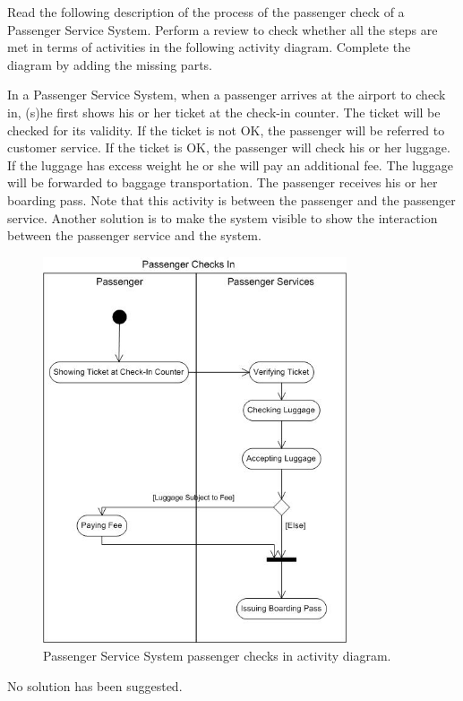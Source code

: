\begin{exercise}
    Read the following description of the process of the passenger check of a Passenger Service System. Perform a review to check whether all the steps are met in terms of activities in the following activity diagram. Complete the diagram by adding the missing parts.
    
    \begin{displayquote}
        In a Passenger Service System, when a passenger arrives at the airport to check in, (s)he first shows his or her ticket at the check-in counter. The ticket will be checked for its validity. If the ticket is not OK, the passenger will be referred to customer service. If the ticket is OK, the passenger will check his or her luggage. If the luggage has excess weight he or she will pay an additional fee. The luggage will be forwarded to baggage transportation. The passenger receives his or her boarding pass. Note that this activity is between the passenger and the passenger service. Another solution is to make the system visible to show the interaction between the passenger service and the system.
    \end{displayquote}
    
    \begin{figure}[H]
        \centering
        \includegraphics[width=0.8\textwidth]{images/passenger-activity.jpg}
        \caption{Passenger Service System passenger checks in activity diagram.}
        \label{fig:pass-checks-in}
    \end{figure}
\end{exercise}

\begin{solution}
    No solution has been suggested.
\end{solution}
